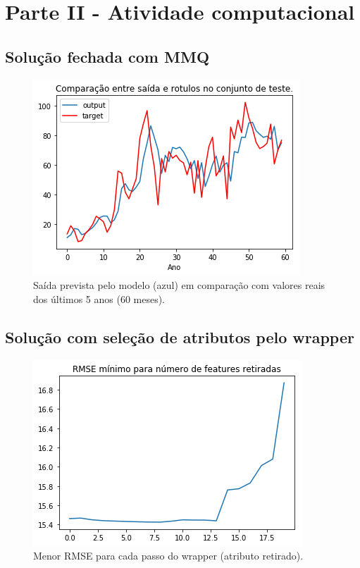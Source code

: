 \documentclass[a4paper, 12pt]{article}
\begin{document}
\newpage

\section*{Parte II - Atividade computacional}

\subsection*{Solução fechada com MMQ}

\begin{figure}[h!]
  \includegraphics{images/raw.png}
    \caption{Saída prevista pelo modelo (azul) em comparação com valores reais dos últimos 5 anos (60 meses).}
\end{figure}

\subsection*{Solução com seleção de atributos pelo wrapper}

\begin{figure}[h!]
  \includegraphics{images/backward.png}
    \caption{Menor RMSE para cada passo do wrapper (atributo retirado).}
\end{figure}
\end{document}
